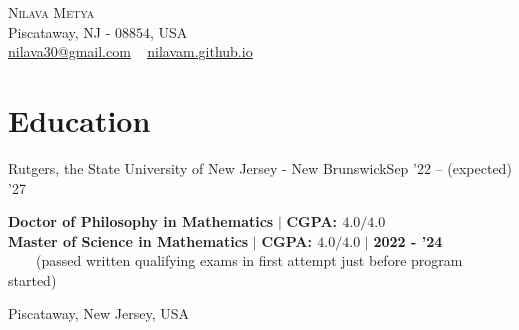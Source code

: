
\usepackage{tabto}
\usepackage{setspace}
\usepackage{etaremune}
\usepackage{xcolor}
\newcommand*\circled[1]{\tikz[baseline=(char.base)]{
            \node[shape=circle,draw,inner sep=1pt, line width=1.1pt] (char) {#1};}}






\begin{center}\vspace{-25pt}
    {\Huge \scshape Nilava Metya} \\ %
    Piscataway, NJ - $08854$, USA\\
{\small 
\href{mailto:nilava30@gmail.com}{\circled{\scriptsize\faEnvelope}  \underline{nilava30@gmail.com}} ~ 
{\circled{\scriptsize\faHome} \underline{\url{nilavam.github.io}}}}
\end{center}



\section{Education}
\resumeSubheading
{Rutgers, the State University of New Jersey - New Brunswick}{Sep '22 -- (expected) '27}
{\begin{minipage}{15cm} \color{grey}\textbf{Doctor of Philosophy in Mathematics}  $|$ \textbf{CGPA: $4.0/4.0$}\\
\textbf{Master of Science in Mathematics}  $|$ \textbf{CGPA: $4.0/4.0$} $|$ \textbf{\color{black}2022 - '24}\\
$\phantom{\qquad}$(passed written qualifying exams in first attempt just before program started) \end{minipage}
}{Piscataway, New Jersey, USA}
\vspace{-7pt}

